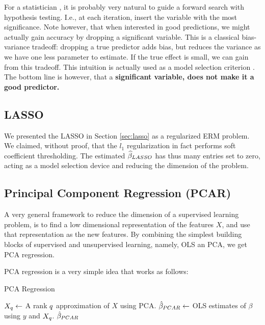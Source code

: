 \begin{remark}
For a statistician , it is probably very natural to guide a forward search with hypothesis testing. I.e., at each iteration, insert the variable with the most significance. 
Note however, that when interested in good predictions, we might actually gain accuracy by dropping a significant variable. This is a classical bias-variance tradeoff: dropping a true predictor adds bias, but reduces the variance as we have one less parameter to estimate. If the true effect is small, we can gain from this tradeoff. 
This intuition is actually used as a model selection criterion \citep{foster_variable_2004}.
The bottom line is however, that a \textbf{significant variable, does not make it a good predictor.} 
\end{remark}



\subsection{LASSO}
We presented the LASSO in Section \ref{sec:lasso} as a regularized ERM problem.
We claimed, without proof, that the $l_1$ regularization in fact performs soft coefficient thresholding. 
The estimated $\widehat{\beta}_{LASSO}$ has thus many entries set to zero, acting as a model selection device and reducing the dimension of the problem.





\subsection{Principal Component Regression (PCAR)}
\label{sec:pca_regression}

A very general framework to reduce the dimension of a supervised learning problem, is to find a low dimensional representation of the features $X$, and use that representation as the new features.
By combining the simplest building blocks of supervised and unsupervised learning, namely, OLS an PCA, we get PCA regression.

PCA regression is a very simple idea that works as follows:
\begin{algorithm}[H]
\caption{PCA Regression}
\label{algo:pca_regression}
\begin{algorithmic}
\State $X_{q} \gets$ A rank $q$ approximation of $X$ using PCA.
\State $\hat{\beta}_{PCAR} \gets$ OLS estimates of $\beta$ using $y$ and $X_q$.
\State \Return $\hat{\beta}_{PCAR}$
\end{algorithmic}
\end{algorithm}



